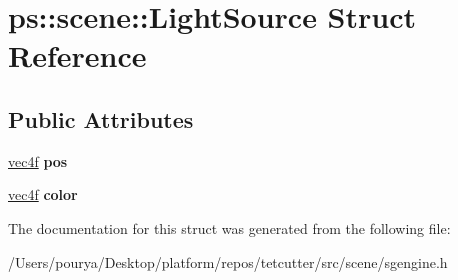 \hypertarget{structps_1_1scene_1_1LightSource}{}\section{ps\+:\+:scene\+:\+:Light\+Source Struct Reference}
\label{structps_1_1scene_1_1LightSource}
\subsection*{Public Attributes}
\begin{DoxyCompactItemize}
\item 
\hypertarget{structps_1_1scene_1_1LightSource_a1ae6c7df7cdc9a09e08f081b45a5b55a}{}\hyperlink{classps_1_1base_1_1Vec4}{vec4f} {\bfseries pos}\label{structps_1_1scene_1_1LightSource_a1ae6c7df7cdc9a09e08f081b45a5b55a}

\item 
\hypertarget{structps_1_1scene_1_1LightSource_a709d27d7d8caa0980c4b9689926d490c}{}\hyperlink{classps_1_1base_1_1Vec4}{vec4f} {\bfseries color}\label{structps_1_1scene_1_1LightSource_a709d27d7d8caa0980c4b9689926d490c}

\end{DoxyCompactItemize}


The documentation for this struct was generated from the following file\+:\begin{DoxyCompactItemize}
\item 
/\+Users/pourya/\+Desktop/platform/repos/tetcutter/src/scene/sgengine.\+h\end{DoxyCompactItemize}
